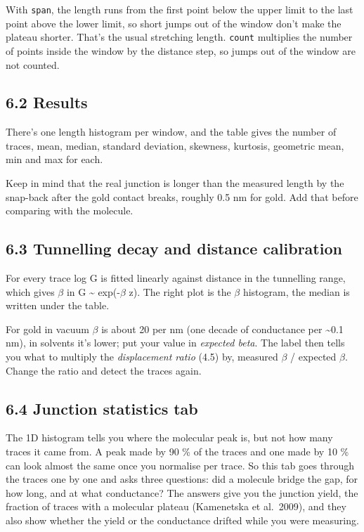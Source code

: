 \documentclass[
  11pt,
  a4paper,
]{article}
\begin{document}
With \texttt{span}, the length runs from the first point below the upper
limit to the last point above the lower limit, so short jumps out of the
window don't make the plateau shorter. That's the usual stretching
length. \texttt{count} multiplies the number of points inside the window
by the distance step, so jumps out of the window are not counted.

\hypertarget{results}{%
\subsection{6.2 Results}\label{results}}

There's one length histogram per window, and the table gives the number
of traces, mean, median, standard deviation, skewness, kurtosis,
geometric mean, min and max for each.

Keep in mind that the real junction is longer than the measured length
by the snap-back after the gold contact breaks, roughly 0.5 nm for gold.
Add that before comparing with the molecule.

\hypertarget{tunnelling-decay-and-distance-calibration}{%
\subsection{6.3 Tunnelling decay and distance
calibration}\label{tunnelling-decay-and-distance-calibration}}

For every trace log G is fitted linearly against distance in the
tunnelling range, which gives $\beta$ in G \textasciitilde{}
exp(-$\beta$ z). The right plot is the $\beta$ histogram, the median is
written under the table.

For gold in vacuum $\beta$ is about 20 per nm (one decade of conductance
per \textasciitilde0.1 nm), in solvents it's lower; put your value in
\emph{expected beta}. The label then tells you what to multiply the
\emph{displacement ratio} (4.5) by, measured $\beta$ / expected $\beta$.
Change the ratio and detect the traces again.

\hypertarget{junction-statistics-tab}{%
\subsection{6.4 Junction statistics tab}\label{junction-statistics-tab}}

The 1D histogram tells you where the molecular peak is, but not how many
traces it came from. A peak made by 90 \% of the traces and one made by
10 \% can look almost the same once you normalise per trace. So this tab
goes through the traces one by one and asks three questions: did a
molecule bridge the gap, for how long, and at what conductance? The
answers give you the junction yield, the fraction of traces with a
molecular plateau (Kamenetska et al.~2009), and they also show whether
the yield or the conductance drifted while you were measuring.
\end{document}
